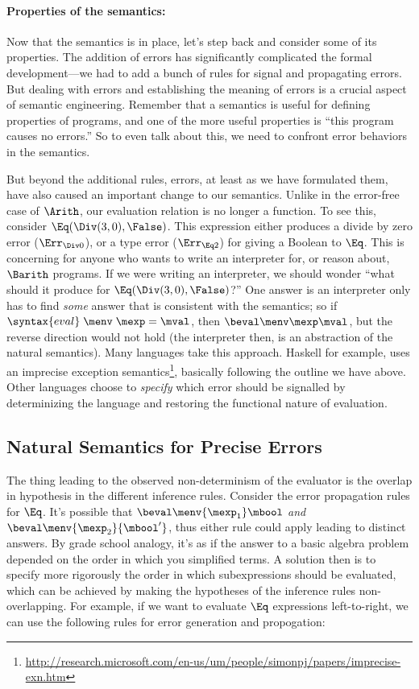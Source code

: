 \paragraph{Properties of the semantics:}
Now that the semantics is in place, let's step back and consider some
of its properties.  The addition of errors has significantly
complicated the formal development---we had to add a bunch of rules
for signal and propagating errors.  But dealing with errors and
establishing the meaning of errors is a crucial aspect of semantic
engineering.  Remember that a semantics is useful for defining
properties of programs, and one of the more useful properties is
``this program causes no errors.''  So to even talk about this, we
need to confront error behaviors in the semantics.

But beyond the additional rules, errors, at least as we have
formulated them, have also caused an important change to our
semantics.  Unlike in the error-free case of $\Arith$, our evaluation
relation is no longer a function.  To see this, consider
$\Eq(\Div(3,0),\False)$.  This expression either produces a divide by
zero error ($\Err_{\Div0}$), or a type error ($\Err_{\Eq2}$) for giving a
Boolean to $\Eq$.  This is concerning for anyone who wants to write an
interpreter for, or reason about, $\Barith$ programs.  If we were
writing an interpreter, we should wonder ``what should it produce for
$\Eq(\Div(3,0),\False)$?''  One answer is an interpreter only has to
find \emph{some} answer that is consistent with the semantics; so if
$\syntax{eval}\; \menv\; \mexp = \mval$, then $\beval\menv\mexp\mval$,
but the reverse direction would not hold (the interpreter then, is an
abstraction of the natural semantics).  Many languages take this
approach.  Haskell for example, uses an imprecise exception
semantics\footnote{\url{http://research.microsoft.com/en-us/um/people/simonpj/papers/imprecise-exn.htm}},
basically following the outline we have above.  Other languages choose
to \emph{specify} which error should be signalled by determinizing the
language and restoring the functional nature of evaluation.

\subsection{Natural Semantics for Precise Errors}

The thing leading to the observed non-determinism of the evaluator is
the overlap in hypothesis in the different inference rules.  Consider the error
propagation rules for $\Eq$.  It's possible that
$\beval\menv{\mexp_1}\mbool$ \emph{and}
$\beval\menv{\mexp_2}{\mbool'}$, thus either rule could apply leading
to distinct answers.  By grade school analogy, it's as if the answer
to a basic algebra problem depended on the order in which you
simplified terms.  A solution then is to specify more rigorously the
order in which subexpressions should be evaluated, which can be
achieved by making the hypotheses of the inference rules
non-overlapping.  For example, if we want to evaluate $\Eq$
expressions left-to-right, we can use the following rules for error
generation and propogation:

